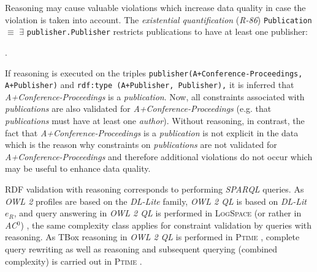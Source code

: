 \documentclass{acm_proc_article-sp}
\newcommand{\ms}[1]{%
  \texttt{#1}
}
\begin{document}
Reasoning may cause valuable violations which increase data quality in case the violation is taken into account.
The {\em existential quantification} (\emph{R-86})
{\small\ms{Publication} \ms{$\equiv$} \ms{$\exists$} \ms{publisher.Publisher}} restricts publications to have at least one publisher: 
\begin{ex}
 .
\end{ex}
If reasoning is executed on the triples {\small\ms{publisher(A+Conference-Proceedings, A+Publisher)} and \ms{rdf:type (A+Publisher, Publisher),}} 
it is inferred that {\em A+Conference-Proceedings} is a {\em publication}.
Now, all constraints associated with {\em publications} are also validated for {\em A+Conference-Proceedings} (e.g. that \emph{publications} must have at least one \emph{author}).
Without reasoning, in contrast, the fact that \emph{A+Conference-Proceedings} is a \emph{publication} is not explicit in the data
which is the reason why constraints on {\em publications} are not validated for \emph{A+Conference-Proceedings}
and therefore additional violations do not occur which may be useful to enhance data quality. 

RDF validation with reasoning corresponds to performing \emph{SPARQL} queries. 
As \emph{OWL 2} profiles are based on the \textit{DL-Lite} family,
\emph{OWL 2 QL} is based on \textit{DL-Lit}$e_R$,
and query answering in \emph{OWL 2 QL} is performed in \textsc{LogSpace} (or rather in \emph{AC$^0$}) \cite{Calvanese2007}, the same complexity class applies for
constraint validation by queries with reasoning.
As TBox reasoning in \emph{OWL 2 QL} is performed in \textsc{Ptime} \cite{Calvanese2007}, 
complete query rewriting as well as reasoning and subsequent querying (combined complexity) is carried out in \textsc{Ptime} \cite{Artale2009,Calvanese2007}.  

%
%
\end{document}
